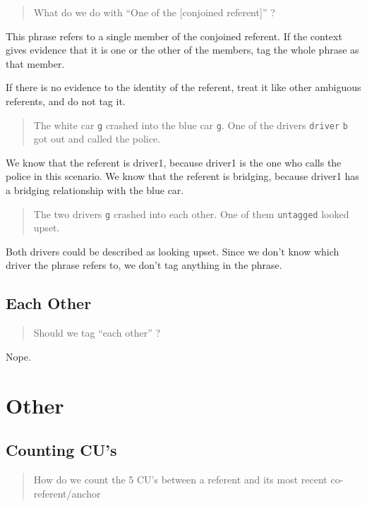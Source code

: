 \documentclass[
]{book}
\begin{document}
\begin{quote}
What do we do with ``One of the {[}conjoined referent{]}'' ?
\end{quote}

This phrase refers to a single member of the conjoined referent.
If the context gives evidence that it is one or the other of the members, tag the whole phrase as that member.

If there is no evidence to the identity of the referent, treat it like other ambiguous referents, and do not tag it.

\begin{quote}
The white car \texttt{g} crashed into the blue car \texttt{g}.
One of the drivers \texttt{driver} \texttt{b} got out and called the police.
\end{quote}

We know that the referent is driver1, because driver1 is the one who calls the police in this scenario.
We know that the referent is bridging, because driver1 has a bridging relationship with the blue car.

\begin{quote}
The two drivers \texttt{g} crashed into each other.
One of them \texttt{untagged} looked upset.
\end{quote}

Both drivers could be described as looking upset.
Since we don't know which driver the phrase refers to, we don't tag anything in the phrase.

\hypertarget{each-other}{%
\subsection{Each Other}\label{each-other}}

\begin{quote}
Should we tag ``each other'' ?
\end{quote}

Nope.

\hypertarget{other}{%
\section{Other}\label{other}}

\hypertarget{counting-cus}{%
\subsection{Counting CU's}\label{counting-cus}}

\begin{quote}
How do we count the 5 CU's between a referent and its most recent co-referent/anchor
\end{quote}
\end{document}
